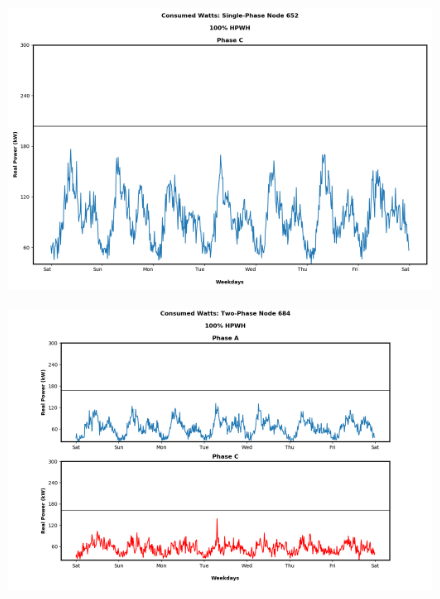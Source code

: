 \begin{figure}[H]
    \centering
    \includegraphics[width=1.1\columnwidth]{Pictures/hundred_single_phase_652_power.png}
    \caption{ }
\end{figure}

\newpage

\begin{figure}[H]
    \centering
    \includegraphics[width=1.1\columnwidth]{Pictures/hundred_two_phase_684_power.png}
    \caption{ }
\end{figure}

\newpage

